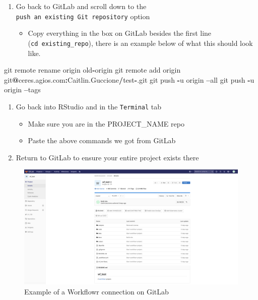 \documentclass[openany]{book}
\newenvironment{Shaded}{\begin{snugshade}}{\end{snugshade}}
\newcommand{\NormalTok}[1]{#1}
\newcommand{\OperatorTok}[1]{\textcolor[rgb]{0.81,0.36,0.00}{\textbf{#1}}}
\providecommand{\tightlist}{%
  \setlength{\itemsep}{0pt}\setlength{\parskip}{0pt}}
\begin{document}
\begin{enumerate}
\def\labelenumi{\arabic{enumi}.}
\setcounter{enumi}{1}
\tightlist
\item
  Go back to GitLab and scroll down to the \texttt{push\ an\ existing\ Git\ repository} option

  \begin{itemize}
  \tightlist
  \item
    Copy everything in the box on GitLab besides the first line (\texttt{cd\ existing\_repo}), there is an example below of what this should look like.
  \end{itemize}
\end{enumerate}

\begin{Shaded}
\begin{Highlighting}[]
\NormalTok{git remote rename origin old}\OperatorTok{-}\NormalTok{origin}
\NormalTok{git remote add origin git}\OperatorTok{@}\NormalTok{ceres.agios.com}\OperatorTok{:}\NormalTok{Caitlin.Guccione}\OperatorTok{/}\NormalTok{test}\OperatorTok{-}\NormalTok{.git}
\NormalTok{git push }\OperatorTok{-}\NormalTok{u origin }\OperatorTok{--}\NormalTok{all}
\NormalTok{git push }\OperatorTok{-}\NormalTok{u origin }\OperatorTok{--}\NormalTok{tags}
\end{Highlighting}
\end{Shaded}

\begin{enumerate}
\def\labelenumi{\arabic{enumi}.}
\setcounter{enumi}{2}
\tightlist
\item
  Go back into RStudio and in the \texttt{Terminal} tab

  \begin{itemize}
  \tightlist
  \item
    Make sure you are in the PROJECT\_NAME repo
  \item
    Paste the above commands we got from GitLab
  \end{itemize}
\item
  Return to GitLab to ensure your entire project exists there
\end{enumerate}

\begin{figure}

{\centering \includegraphics[width=1\linewidth]{images/Workflow_Photos/screen_shot} 

}

\caption{Example of a Workflowr connection on GitLab}\label{fig:a3}
\end{figure}
\end{document}
